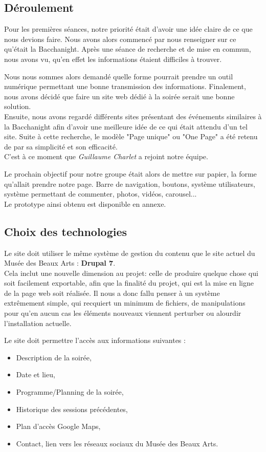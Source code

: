 \documentclass[11pt]{report}
\begin{document}
\subsection{Déroulement}

Pour les premières séances, notre priorité était d'avoir une idée claire
de ce que nous devions faire. Nous avons alors commencé par nous renseigner sur
ce qu'était la Bacchanight. Après une séance de recherche et de mise en commun,
nous avons vu, qu'en effet les informations étaient difficiles à trouver.
\par
Nous nous sommes alors demandé quelle forme pourrait prendre un outil numérique
permettant une bonne transmission des informations. Finalement, nous avons décidé
que faire un site web dédié à la soirée serait une bonne solution. \\
Ensuite, nous avons regardé différents sites présentant des événements similaires
à la Bacchanight afin d'avoir une meilleure idée de ce qui était attendu d'un
tel site. Suite à cette recherche, le modèle "Page unique" ou "One Page" a été
retenu de par sa simplicité et son efficacité. \\
C'est à ce moment que \textit{Guillaume Charlet} a rejoint notre équipe.
\par
Le prochain objectif pour notre groupe était alors de mettre sur papier,
la forme qu'allait prendre notre page. Barre de navigation, boutons,
système utilisateurs, système permettant de commenter, photos, vidéos, carousel... \\
Le prototype ainsi obtenu est disponible en annexe.

\subsection{Choix des technologies}

Le site doit utiliser le même système de gestion du contenu que le site actuel
du Musée des Beaux Arts : \textbf{Drupal 7}. \\
Cela inclut une nouvelle dimension au projet: celle de produire quelque chose
qui soit facilement exportable, afin que la finalité du projet, qui est la mise
en ligne de la page web soit réalisée. Il nous a donc fallu penser à un système
extrêmement simple, qui recquiert un minimum de fichiers, de manipulations pour
qu'en aucun cas les éléments nouveaux viennent perturber ou alourdir
l'installation actuelle.

Le site doit permettre l'accès aux informations suivantes :
\begin{itemize}
	\item Description de la soirée,
	\item Date et lieu,
	\item Programme/Planning de la soirée,
	\item Historique des sessions précédentes,
	\item Plan d'accès Google Maps,
	\item Contact, lien vers les réseaux sociaux du Musée des Beaux Arts.
\end{itemize}
\end{document}

